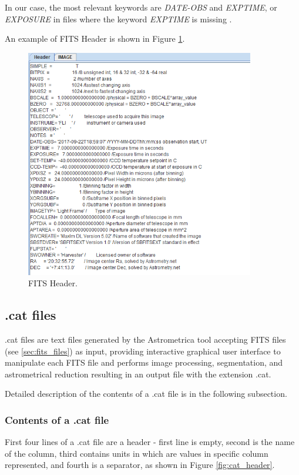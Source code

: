 	 In our case, the most relevant keywords are \emph{DATE-OBS} and \emph{EXPTIME}, or \emph{EXPOSURE} in files where the keyword \emph{EXPTIME} is missing \citep{FITSdefinition}.
	 
	 An example of FITS Header is shown in Figure \ref{fig:fits_header}.
	
	\begin{figure}[H]
	\centering
	  \includegraphics[width=10cm]{images/fits_header_example}
		  \caption{FITS Header.}
	  \label{fig:fits_header}
	\end{figure}

\subsection{.cat files}\label{sec:cat_files}
	
	.cat files are text files generated by the Astrometrica tool accepting FITS files (see \ref{sec:fits_files}) as input, providing interactive graphical user interface to manipulate each FITS file and performs image processing, segmentation, and astrometrical reduction resulting in an output file with the extension .cat.
	
	 Detailed description of the contents of a .cat file is in the following subsection.
	
\subsubsection{Contents of a .cat file}\label{subsubsec:content_cat}
	
	First four lines of a .cat file are a header - first line is empty, second is the name of the column, third contains units in which are values in specific column represented, and fourth is a separator, as shown in Figure \ref{fig:cat_header}.
	
